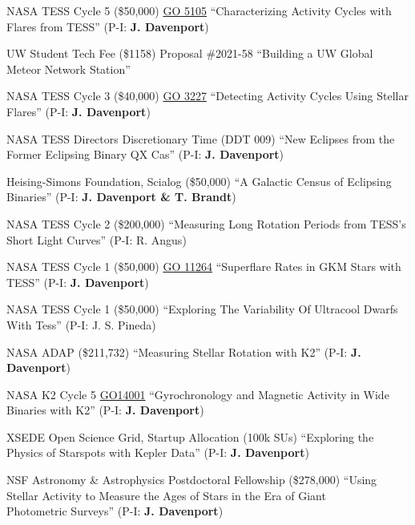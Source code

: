 \documentclass{article}
\begin{document}
\begin{llist}
NASA TESS Cycle 5 (\$50,000) \href{https://heasarc.gsfc.nasa.gov/docs/tess/approved-programs.html#cycle-5}{\color{NavyBlue} GO 5105}
``Characterizing Activity Cycles with Flares from TESS'' (P-I: {\bf J. Davenport})

UW Student Tech Fee (\$1158) Proposal \#2021-58 
``Building a UW Global Meteor Network Station''

NASA TESS Cycle 3 (\$40,000) \href{https://heasarc.gsfc.nasa.gov/docs/tess/approved-programs-em1.html#cycle-3}{\color{NavyBlue} GO 3227}
``Detecting Activity Cycles Using Stellar Flares'' (P-I: {\bf J. Davenport})

NASA TESS Directors Discretionary Time (DDT 009) 
``New Eclipses from the Former Eclipsing Binary QX Cas'' (P-I: {\bf J. Davenport})

Heising-Simons Foundation, Scialog (\$50,000) 
``A Galactic Census of Eclipsing Binaries'' (P-I: {\bf J. Davenport \& T. Brandt})

NASA TESS Cycle 2 (\$200,000) 
``Measuring Long Rotation Periods from TESS's Short Light Curves'' (P-I: R. Angus)

NASA TESS Cycle 1 (\$50,000) \href{https://heasarc.gsfc.nasa.gov/docs/tess/approved-programs-primary.html#cycle-1}{\color{NavyBlue} GO 11264}  
``Superflare Rates in GKM Stars with TESS'' (P-I: {\bf J. Davenport})

NASA TESS Cycle 1 (\$50,000) 
``Exploring The Variability Of Ultracool Dwarfs With Tess'' (P-I: J. S. Pineda)

NASA ADAP (\$211,732) 
``Measuring Stellar Rotation with K2'' (P-I: {\bf J. Davenport})

NASA K2 Cycle 5 \href{https://keplergo.arc.nasa.gov/data/k2-programs/GO14001.txt}{\color{NavyBlue}GO14001} 
``Gyrochronology and Magnetic Activity in Wide Binaries with K2'' (P-I: {\bf J. Davenport})



XSEDE Open Science Grid, Startup Allocation (100k SUs) 
``Exploring the Physics of Starspots with Kepler Data'' (P-I: {\bf J. Davenport})

NSF Astronomy \& Astrophysics Postdoctoral Fellowship (\$278,000) 
``Using Stellar Activity to Measure the Ages of Stars in the Era of Giant\\ Photometric Surveys'' (P-I: {\bf J. Davenport})


\end{llist}
\end{document}
